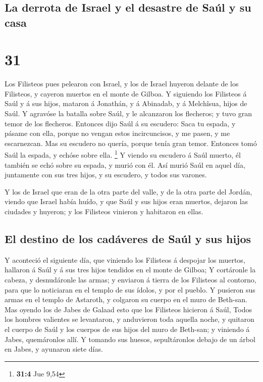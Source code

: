 \hypertarget{la-derrota-de-israel-y-el-desastre-de-sauxfal-y-su-casa}{%
\subsection{La derrota de Israel y el desastre de Saúl y su
casa}\label{la-derrota-de-israel-y-el-desastre-de-sauxfal-y-su-casa}}

\hypertarget{section-30}{%
\section{31}\label{section-30}}

 Los Filisteos pues pelearon con Israel, y los de Israel
huyeron delante de los Filisteos, y cayeron muertos en el monte de
Gilboa.  Y siguiendo los Filisteos á Saúl y á sus hijos,
mataron á Jonathán, y á Abinadab, y á Melchîsua, hijos de Saúl.
 Y agravóse la batalla sobre Saúl, y le alcanzaron los
flecheros; y tuvo gran temor de los flecheros.  Entonces
dijo Saúl á su escudero: Saca tu espada, y pásame con ella, porque no
vengan estos incircuncisos, y me pasen, y me escarnezcan. Mas su
escudero no quería, porque tenía gran temor. Entonces tomó Saúl la
espada, y echóse sobre ella. \footnote{\textbf{31:4} Jue 9,54}
 Y viendo su escudero á Saúl muerto, él también se echó
sobre su espada, y murió con él.  Así murió Saúl en aquel
día, juntamente con sus tres hijos, y su escudero, y todos sus varones.

 Y los de Israel que eran de la otra parte del valle, y de
la otra parte del Jordán, viendo que Israel había huído, y que Saúl y
sus hijos eran muertos, dejaron las ciudades y huyeron; y los Filisteos
vinieron y habitaron en ellas.

\hypertarget{el-destino-de-los-caduxe1veres-de-sauxfal-y-sus-hijos}{%
\subsection{El destino de los cadáveres de Saúl y sus
hijos}\label{el-destino-de-los-caduxe1veres-de-sauxfal-y-sus-hijos}}

 Y aconteció el siguiente día, que viniendo los Filisteos á
despojar los muertos, hallaron á Saúl y á sus tres hijos tendidos en el
monte de Gilboa;  Y cortáronle la cabeza, y desnudáronle las
armas; y enviaron á tierra de los Filisteos al contorno, para que lo
noticiaran en el templo de sus ídolos, y por el pueblo.  Y
pusieron sus armas en el templo de Astaroth, y colgaron su cuerpo en el
muro de Beth-san.  Mas oyendo los de Jabes de Galaad esto
que los Filisteos hicieron á Saúl,  Todos los hombres
valientes se levantaron, y anduvieron toda aquella noche, y quitaron el
cuerpo de Saúl y los cuerpos de sus hijos del muro de Beth-san; y
viniendo á Jabes, quemáronlos allí.  Y tomando sus huesos,
sepultáronlos debajo de un árbol en Jabes, y ayunaron siete días.
